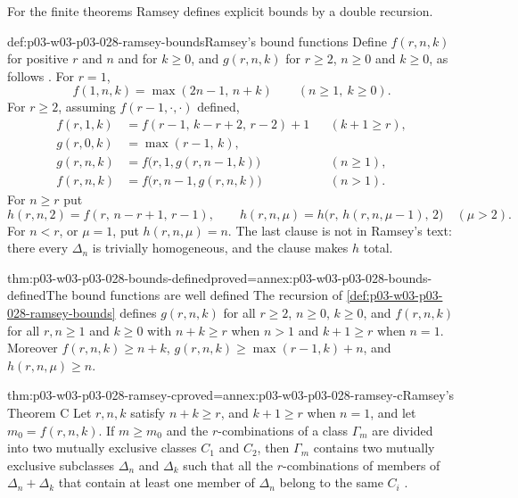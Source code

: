 For the finite theorems Ramsey defines explicit bounds by a double
recursion.

\begin{hbdefinition}{def:p03-w03-p03-028-ramsey-bounds}{Ramsey's bound functions}
Define \(f(r,n,k)\) for positive \(r\) and \(n\) and for \(k\geq0\), and
\(g(r,n,k)\) for \(r\geq2\), \(n\geq0\) and \(k\geq0\), as follows
\cite[p.~267]{Ramsey1930}.  For \(r=1\),
\[
  f(1,n,k)=\max(2n-1,\,n+k)\qquad(n\geq1,\ k\geq0).
\]
For \(r\geq2\), assuming \(f(r-1,\cdot,\cdot)\) defined,
\begin{align*}
  f(r,1,k)&=f(r-1,\,k-r+2,\,r-2)+1 &&(k+1\geq r),\\
  g(r,0,k)&=\max(r-1,\,k),\\
  g(r,n,k)&=f\bigl(r,1,g(r,n-1,k)\bigr) &&(n\geq1),\\
  f(r,n,k)&=f\bigl(r,n-1,g(r,n,k)\bigr) &&(n>1).
\end{align*}
For \(n\geq r\) put \cite[p.~269]{Ramsey1930}
\[
  h(r,n,2)=f(r,\,n-r+1,\,r-1),\qquad
  h(r,n,\mu)=h\bigl(r,\,h(r,n,\mu-1),\,2\bigr)\quad(\mu>2).
\]
For \(n<r\), or \(\mu=1\), put \(h(r,n,\mu)=n\).  The last clause is not in
Ramsey's text: there every \(\Delta_n\) is trivially homogeneous, and the
clause makes \(h\) total.
\end{hbdefinition}

\begin{hblemma}{thm:p03-w03-p03-028-bounds-defined}{proved=annex:p03-w03-p03-028-bounds-defined}{The bound functions are well defined}
The recursion of \cref{def:p03-w03-p03-028-ramsey-bounds} defines
\(g(r,n,k)\) for all \(r\geq2\), \(n\geq0\), \(k\geq0\), and
\(f(r,n,k)\) for all \(r,n\geq1\) and \(k\geq0\) with \(n+k\geq r\) when
\(n>1\) and \(k+1\geq r\) when \(n=1\).  Moreover
\(f(r,n,k)\geq n+k\), \(g(r,n,k)\geq\max(r-1,k)+n\), and
\(h(r,n,\mu)\geq n\).
\end{hblemma}

\begin{hbtheorem}{thm:p03-w03-p03-028-ramsey-c}{proved=annex:p03-w03-p03-028-ramsey-c}{Ramsey's Theorem C}
Let \(r,n,k\) satisfy \(n+k\geq r\), and \(k+1\geq r\) when \(n=1\), and
let \(m_0=f(r,n,k)\).  If \(m\geq m_0\) and the \(r\)-combinations of a
class \(\Gamma_m\) are divided into two mutually exclusive classes \(C_1\)
and \(C_2\), then \(\Gamma_m\) contains two mutually exclusive subclasses
\(\Delta_n\) and \(\Delta_k\) such that all the \(r\)-combinations of
members of \(\Delta_n+\Delta_k\) that contain at least one member of
\(\Delta_n\) belong to the same \(C_i\)
\cite[p.~267, proof pp.~267--269]{Ramsey1930}.
\end{hbtheorem}

